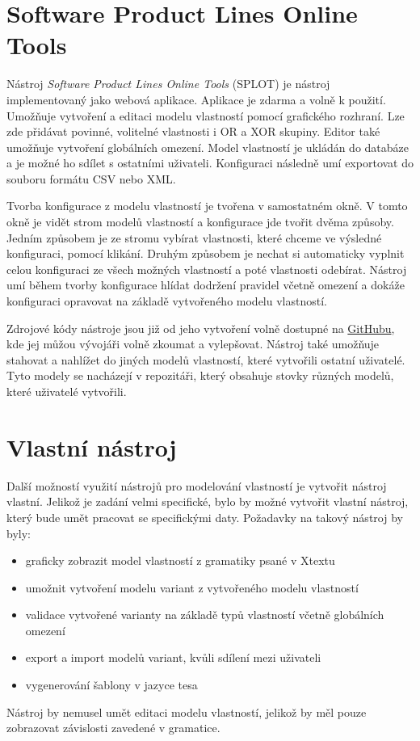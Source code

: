 \section{Software Product Lines Online Tools}
Nástroj \textit{Software Product Lines Online Tools} (SPLOT) je nástroj implementovaný jako webová aplikace. Aplikace je zdarma a volně k použití. Umožňuje vytvoření a editaci modelu vlastností pomocí grafického rozhraní. Lze zde přidávat povinné, volitelné vlastnosti i OR a XOR skupiny. Editor také umožňuje vytvoření globálních omezení. Model vlastností je ukládán do databáze a je možné ho sdílet s ostatními uživateli. Konfiguraci následně umí exportovat do souboru formátu CSV nebo XML.

Tvorba konfigurace z modelu vlastností je tvořena v samostatném okně. V tomto okně je vidět strom modelů vlastností a konfigurace jde tvořit dvěma způsoby. Jedním způsobem je ze stromu vybírat vlastnosti, které chceme ve výsledné konfiguraci, pomocí klikání. Druhým způsobem je nechat si automaticky vyplnit celou konfiguraci ze všech možných vlastností a poté vlastnosti odebírat. Nástroj umí během tvorby konfigurace hlídat dodržení pravidel včetně omezení a dokáže konfiguraci opravovat na základě vytvořeného modelu vlastností. 

Zdrojové kódy nástroje jsou již od jeho vytvoření volně dostupné na \href{https://github.com/marcilio/splot}{GitHubu}, kde jej můžou vývojáři volně zkoumat a vylepšovat. Nástroj také umožňuje stahovat a nahlížet do jiných modelů vlastností, které vytvořili ostatní uživatelé. Tyto modely se nacházejí v repozitáři, který obsahuje stovky různých modelů, které uživatelé vytvořili.



\section{Vlastní nástroj}

Další možností využití nástrojů pro modelování vlastností je vytvořit nástroj vlastní. Jelikož je zadání velmi specifické, bylo by možné vytvořit vlastní nástroj, který bude umět pracovat se specifickými daty. Požadavky na takový nástroj by byly:
\begin{itemize}
	\item graficky zobrazit model vlastností z gramatiky psané v Xtextu
	\item umožnit vytvoření modelu variant z vytvořeného modelu vlastností
	\item validace vytvořené varianty na základě typů vlastností včetně globálních omezení
	\item export a import modelů variant, kvůli sdílení mezi uživateli
	\item vygenerování šablony v jazyce tesa
\end{itemize}
Nástroj by nemusel umět editaci modelu vlastností, jelikož by měl pouze zobrazovat závislosti zavedené v gramatice.

